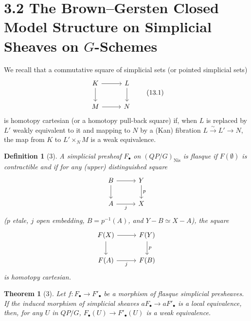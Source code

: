 \documentclass[11pt]{article}
\newcommand{\Nis}{\mathrm{Nis}}
\theoremstyle{deligne}
\newtheorem*{theorem*}{Theorem}
\newtheorem*{definition*}{Definition}
\begin{document}
\section*{3.2 The Brown--Gersten Closed Model Structure on Simplicial Sheaves on \(G\)-Schemes}

We recall that a commutative square of simplicial sets (or pointed simplicial sets)
\[
\begin{tikzcd}[column sep=2.8em,row sep=2em]
K \arrow[r] \arrow[d] & L \arrow[d]\\
M \arrow[r] & N
\end{tikzcd}
\tag{13.1}
\]
is homotopy cartesian (or a homotopy pull-back square) if, when \(L\) is replaced by \(L'\) weakly equivalent to it and mapping to \(N\) by a (Kan) fibration \(L\overset{\sim}{\to}L'\to N\), the map from \(K\) to \(L'\times_NM\) is a weak equivalence.

\begin{definition*}[3]
A simplicial presheaf \(F_\bullet\) on \((QP/G)_{\Nis}\) is flasque if \(F(\emptyset)\) is contractible and if for any (upper) distinguished square
\[
\begin{tikzcd}[column sep=2.8em,row sep=2em]
B \arrow[r] \arrow[d] & Y \arrow[d,"p"]\\
A \arrow[r,"j"'] & X
\end{tikzcd}
\]
(\(p\) etale, \(j\) open embedding, \(B=p^{-1}(A)\), and \(Y-B\simeq X-A\)), the square
\[
\begin{tikzcd}[column sep=2.8em,row sep=2em]
F(X) \arrow[r] \arrow[d] & F(Y) \arrow[d,"p"]\\
F(A) \arrow[r,"j"'] & F(B)
\end{tikzcd}
\]
is homotopy cartesian.
\end{definition*}

\begin{theorem*}[3]
Let \(f:F_\bullet\to F'_\bullet\) be a morphism of flasque simplicial presheaves. If the induced morphism of simplicial sheaves \(aF_\bullet\to aF'_\bullet\) is a local equivalence, then, for any \(U\) in \(QP/G\), \(F_\bullet(U)\to F'_\bullet(U)\) is a weak equivalence.
\end{theorem*}
\end{document}
